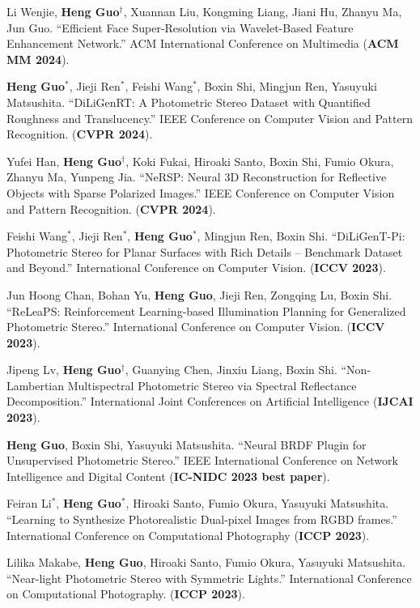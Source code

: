 \documentclass[UTF8]{ctexart}
\begin{document}
\begin{enumerate}[label={[\arabic*]}]
		\item Li Wenjie, \textbf{Heng Guo}$^\dagger$, Xuannan Liu, Kongming Liang, Jiani Hu, Zhanyu Ma, Jun Guo. ``Efficient Face Super-Resolution via Wavelet-Based Feature Enhancement Network.'' ACM International Conference on Multimedia (\textbf{ACM MM 2024}).
		\item \textbf{Heng Guo}$^*$, Jieji Ren$^*$, Feishi Wang$^*$, Boxin Shi, Mingjun Ren, Yasuyuki Matsushita. ``DiLiGenRT: A Photometric Stereo Dataset with Quantified Roughness and Translucency.'' IEEE Conference on Computer Vision and Pattern Recognition. (\textbf{CVPR 2024}).
		\item Yufei Han, \textbf{Heng Guo$^\dagger$}, Koki Fukai, Hiroaki Santo, Boxin Shi, Fumio Okura, Zhanyu Ma, Yunpeng Jia. ``NeRSP: Neural 3D Reconstruction for Reflective Objects with Sparse Polarized Images.'' IEEE Conference on Computer Vision and Pattern Recognition. (\textbf{CVPR 2024}).
		\item Feishi Wang$^*$, Jieji Ren$^*$, \textbf{Heng Guo}$^*$, Mingjun Ren, Boxin Shi. ``DiLiGenT-Pi: Photometric Stereo for Planar Surfaces with Rich Details – Benchmark Dataset and Beyond.'' International Conference on Computer Vision. (\textbf{ICCV 2023}).
		\item Jun Hoong Chan, Bohan Yu, \textbf{Heng Guo}, Jieji Ren, Zongqing Lu, Boxin Shi. ``ReLeaPS: Reinforcement Learning-based Illumination Planning for Generalized Photometric Stereo.'' International Conference on Computer Vision. (\textbf{ICCV 2023}).
		\item Jipeng Lv, \textbf{Heng Guo$^{\dagger}$}, Guanying Chen, Jinxiu Liang, Boxin Shi. ``Non-Lambertian Multispectral Photometric Stereo via Spectral Reflectance Decomposition.'' International Joint Conferences on Artificial Intelligence (\textbf{IJCAI 2023}).
		\item \textbf{Heng Guo}, Boxin Shi, Yasuyuki Matsushita. ``Neural BRDF Plugin for Unsupervised Photometric Stereo.'' IEEE International Conference on Network Intelligence and Digital Content (\textbf{IC-NIDC 2023 best paper}).
		\item Feiran Li$^*$, \textbf{Heng Guo}$^*$, Hiroaki Santo, Fumio Okura, Yasuyuki Matsushita. ``Learning to Synthesize Photorealistic Dual-pixel Images from RGBD frames.'' International Conference on Computational Photography (\textbf{ICCP 2023}).
		\item Lilika Makabe, \textbf{Heng Guo}, Hiroaki Santo, Fumio Okura, Yasuyuki Matsushita. ``Near-light Photometric Stereo with Symmetric Lights.'' International Conference on Computational Photography. (\textbf{ICCP 2023}).

\end{enumerate}
\end{document}
